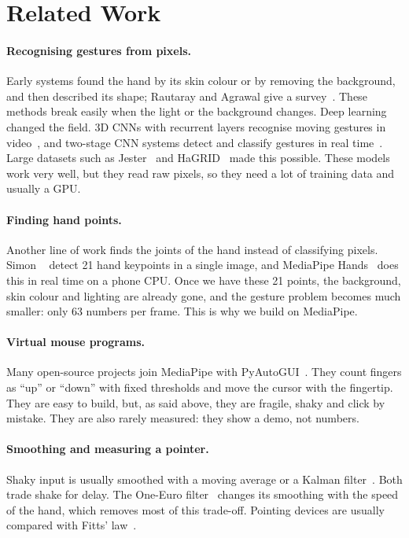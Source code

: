 \section{Related Work}
\label{sec:related}

\paragraph{Recognising gestures from pixels.} Early systems found the hand
by its skin colour or by removing the background, and then described its shape;
Rautaray and Agrawal give a survey~\cite{rautaray2015survey}. These methods
break easily when the light or the background changes. Deep learning changed
the field. 3D CNNs with recurrent layers recognise moving gestures in
video~\cite{molchanov2016online}, and two-stage CNN systems detect and
classify gestures in real time~\cite{kopuklu2019realtime}. Large datasets
such as Jester~\cite{materzynska2019jester} and HaGRID~\cite{kapitanov2024hagrid}
made this possible. These models work very well, but they read raw pixels, so
they need a lot of training data and usually a GPU.

\paragraph{Finding hand points.} Another line of work finds the joints of
the hand instead of classifying pixels. Simon \etal~\cite{simon2017hand} detect
21 hand keypoints in a single image, and MediaPipe
Hands~\cite{zhang2020mediapipe} does this in real time on a phone CPU. Once we
have these 21 points, the background, skin colour and lighting are already
gone, and the gesture problem becomes much smaller: only 63 numbers per frame.
This is why we build on MediaPipe.

\paragraph{Virtual mouse programs.} Many open-source projects join MediaPipe
with PyAutoGUI~\cite{pyautogui}. They count fingers as ``up'' or ``down'' with
fixed thresholds and move the cursor with the fingertip. They are easy to
build, but, as said above, they are fragile, shaky and click by mistake.
They are also rarely measured: they show a demo, not numbers.

\paragraph{Smoothing and measuring a pointer.} Shaky input is usually
smoothed with a moving average or a Kalman filter~\cite{kalman1960}. Both
trade shake for delay. The One-Euro filter~\cite{casiez2012oneeuro} changes
its smoothing with the speed of the hand, which removes most of this
trade-off. Pointing devices are usually compared with Fitts'
law~\cite{fitts1954,soukoreff2004}.

